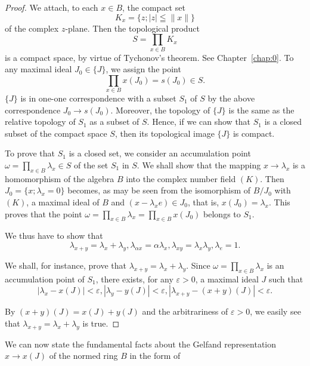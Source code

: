 \begin{proof}
 We attach, to each $x \in B$, the compact set 
\[
K _{x} = \{z; | z | \leqq \| x \| \}
\]
of the complex $z$-plane. Then the topological product 
\[
S = \prod\limits_{x \in B} K _{x}
\]
is a compact space, by virtue of Tychonov's theorem. See Chapter~\ref{chap:0}. To any maximal ideal $J_0 \in \{J\}$, we assign the point 
\[
\prod\limits_{x \in B} x (J _{0}) = s (J _{0}) \in S.
\]
$\{J\}$ is in one-one correspondence with a subset $S_{1}$ of $S$ by the above correspondence $J_{0} \rightarrow s(J_{0})$. Moreover, the topology of $\{J\}$ is the same as the relative topology of $S_{1}$ as a subset of $S$. Hence, if we can show that $S_{1}$ is a closed subset of the compact space $S$, then its topological image $\{J\}$ is compact. 

To prove that $S_{1}$ is a closed set, we consider an accumulation point $\omega = \prod\limits_{x \in B} \lambda_x \in S$ of the set $S_{1}$ in $S$. We shall show that the mapping $x \to \lambda_x$ is a homomorphism of the algebra $B$ into the complex number field $(K)$. Then $J_0 = \{x; \lambda_x = 0\}$ becomes, as may be seen from the isomorphism of $B / J_0$ with $(K)$, a maximal ideal of $B$ and $(x - \lambda_x e) \in J_0$, that is, $x(J_0) = \lambda_x$. This proves that the point $\omega = \prod\limits_{x \in B} \lambda_x = \prod\limits_{x \in B} x(J_0)$ belongs to $S_{1}$. 

We thus have to show that 
\[
\lambda_{x+y} = \lambda_{x} + \lambda_{y}, \lambda_{\alpha x} = \alpha \lambda_{x}, \lambda_{xy} = \lambda_{x} \lambda_{y}, \lambda_{e} = 1.
\]

We shall, for instance, prove that $\lambda_{x+y} = \lambda_x + \lambda_y$. Since $\omega = \prod\limits_{x \in B} \lambda_x$ is an accumulation point of $S_1$, there exists, for any $\varepsilon > 0$, a maximal ideal $J$ such that 
\begin{equation}\label{eq:XI.2.4}
\left| \lambda_{x} - x (J) \right| < \varepsilon , \left| \lambda_{y} - y (J) \right| < \varepsilon , \left| \lambda_{x+y} - (x + y) (J) \right| < \varepsilon .
\end{equation}

By $(x + y)(J) = x(J) + y(J)$ and the arbitrariness of $\varepsilon > 0$, we easily see that $\lambda_{x+y} = \lambda_x + \lambda_y$ is true. 
\end{proof}

We can now state the fundamental facts about the Gelfand representation $x \to x(J)$ of the normed ring $B$ in the form of 

